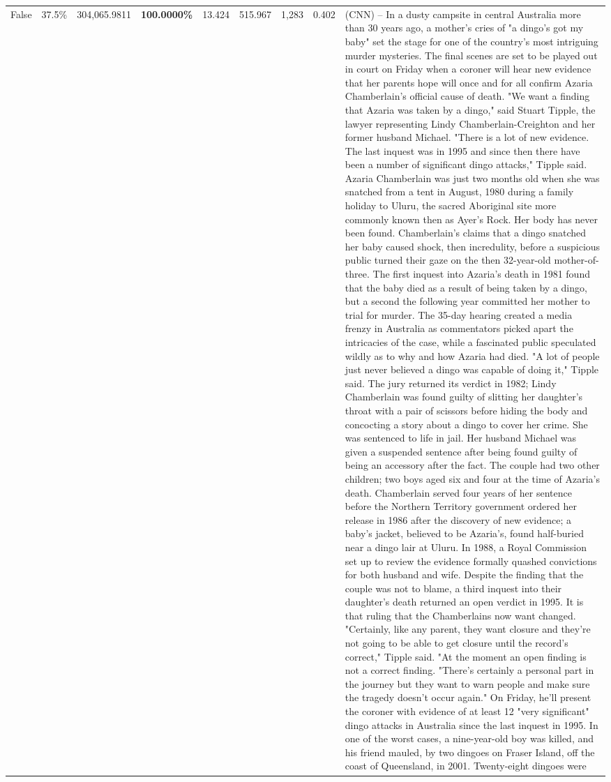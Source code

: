 \begin{table}[H]
\begin{tabular}{lllrlllll}
False & 37.5\% & 304,065.9811 & \bfseries \color{red} 100.0000\% & 13.424 & 515.967 & 1,283 & 0.402 & (CNN) -- In a dusty campsite in central Australia more than 30 years ago, a mother's cries of "a dingo's got my baby" set the stage for one of the country's most intriguing murder mysteries. The final scenes are set to be played out in court on Friday when a coroner will hear new evidence that her parents hope will once and for all confirm Azaria Chamberlain's official cause of death. "We want a finding that Azaria was taken by a dingo," said Stuart Tipple, the lawyer representing Lindy Chamberlain-Creighton and her former husband Michael. "There is a lot of new evidence. The last inquest was in 1995 and since then there have been a number of significant dingo attacks," Tipple said. Azaria Chamberlain was just two months old when she was snatched from a tent in August, 1980 during a family holiday to Uluru, the sacred Aboriginal site more commonly known then as Ayer's Rock. Her body has never been found. Chamberlain's claims that a dingo snatched her baby caused shock, then incredulity, before a suspicious public turned their gaze on the then 32-year-old mother-of-three. The first inquest into Azaria's death in 1981 found that the baby died as a result of being taken by a dingo, but a second the following year committed her mother to trial for murder. The 35-day hearing created a media frenzy in Australia as commentators picked apart the intricacies of the case, while a fascinated public speculated wildly as to why and how Azaria had died. "A lot of people just never believed a dingo was capable of doing it," Tipple said. The jury returned its verdict in 1982; Lindy Chamberlain was found guilty of slitting her daughter's throat with a pair of scissors before hiding the body and concocting a story about a dingo to cover her crime. She was sentenced to life in jail. Her husband Michael was given a suspended sentence after being found guilty of being an accessory after the fact. The couple had two other children; two boys aged six and four at the time of Azaria's death. Chamberlain served four years of her sentence before the Northern Territory government ordered her release in 1986 after the discovery of new evidence; a baby's jacket, believed to be Azaria's, found half-buried near a dingo lair at Uluru. In 1988, a Royal Commission set up to review the evidence formally quashed convictions for both husband and wife. Despite the finding that the couple was not to blame, a third inquest into their daughter's death returned an open verdict in 1995. It is that ruling that the Chamberlains now want changed. "Certainly, like any parent, they want closure and they're not going to be able to get closure until the record's correct," Tipple said. "At the moment an open finding is not a correct finding. "There's certainly a personal part in the journey but they want to warn people and make sure the tragedy doesn't occur again." On Friday, he'll present the coroner with evidence of at least 12 "very significant" dingo attacks in Australia since the last inquest in 1995. In one of the worst cases, a nine-year-old boy was killed, and his friend mauled, by two dingoes on Fraser Island, off the coast of Queensland, in 2001. Twenty-eight dingoes were 
\end{tabular}
\end{table}
